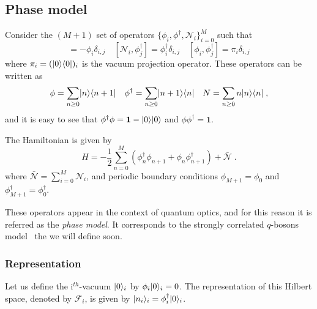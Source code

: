 \documentclass[a4paper,11pt]{amsart}
\begin{document}

\subsection{Phase model}
Consider the \((M+1)\) set of operators \(\{\phi_i,
\phi^\dagger,\mathcal{N}_i\}_{i=0}^M\) such that
\begin{equation}
 [\mathcal{N}_i, \phi_j] = - \phi_i \delta_{i,j} \quad
 [\mathcal{N}_i, \phi_j^\dagger] =  \phi_i^\dagger \delta_{i,j}  \quad 
 [\phi_i, \phi_j^\dagger] =  \pi_i \delta_{i,j}  
\end{equation}
where \(\pi_i =(\lvert0\rangle \langle0\rvert)_i\) is the vacuum projection operator.
These operators can be written as
\begin{equation}
\phi = \sum_{n\geq 0}\lvert n\rangle\langle n+1\rvert\quad 
\phi^\dagger = \sum_{n\geq 0}\lvert n+1\rangle\langle n\rvert \quad 
N = \sum_{n\geq 0}n\lvert n\rangle\langle n\rvert\; ,
\end{equation}
and it is easy to see that \(\phi^\dagger \phi = \bm{1} - \lvert0\rangle
\lvert0\rangle\) and \(\phi\phi^\dagger = \bm{1}\).

The Hamiltonian is given by
\begin{equation}
  H = - \frac{1}{2} \sum_{n =0}^M \left(\phi_n^\dagger \phi_{n+1}
  + \phi_n \phi_{n+1}^\dagger \right) + \bar{\mathcal{N}}\; .
\end{equation}
where \(\bar{\mathcal{N}} = \sum_{i=0}^M \mathcal{N}_i\), and
periodic boundary conditions \(\phi_{M+1} = \phi_0\) and
\(\phi_{M+1}^\dagger = \phi_0^\dagger\).

These operators appear in the context of quantum optics, and for
this reason it is referred as the \emph{phase model}. It 
corresponds to the strongly correlated \(q\)-bosons
model~\cite{Bogoliubov:1997soj} the we will define soon.

\subsubsection{Representation}
Let us define the i\(^{th}\)-vacuum \(\lvert0\rangle_i\) by \(\phi_i\lvert0\rangle_i
= 0\).  The representation of this Hilbert space, denoted by
\(\mathcal{F}_i\), is given by \(\lvert n_i\rangle_i = \phi_i^\dagger
\lvert0\rangle_i\).
\end{document}
